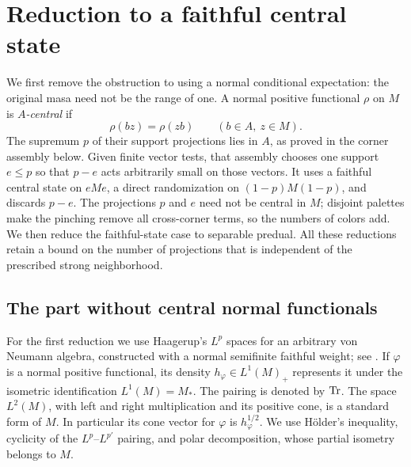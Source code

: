 \section{Reduction to a faithful central state}\label{sec:reductions}

We first remove the obstruction to using a normal conditional expectation:
the original masa need not be the range of one.  A normal positive
functional $\rho$ on $M$ is \emph{$A$-central} if
\[
 \rho(bz)=\rho(zb)\qquad(b\in A,\ z\in M).
\]
The supremum $p$ of their support projections lies in $A$, as proved in
the corner assembly below. Given finite vector tests, that assembly chooses
one support $e\leq p$ so that $p-e$ acts arbitrarily small on those vectors.
It uses a faithful central state on $eMe$, a direct randomization on
$(1-p)M(1-p)$, and discards $p-e$. The projections $p$ and $e$ need not be
central in $M$; disjoint palettes make the pinching remove all cross-corner
terms, so the numbers of colors add. We then reduce the faithful-state case
to separable predual. All these reductions retain a bound on the number of
projections that is independent of the prescribed strong neighborhood.

\subsection{The part without central normal functionals}

For the first reduction we use Haagerup's $L^p$ spaces for an arbitrary
von Neumann algebra, constructed with a normal semifinite faithful
weight; see \cite[Section~1]{Haa79}.  If $\varphi$ is a normal positive
functional, its density $h_\varphi\in L^1(M)_+$ represents it under the
isometric identification $L^1(M)=M_*$.  The pairing is denoted by $\operatorname{Tr}$.
The space $L^2(M)$, with left and right multiplication and its positive
cone, is a standard form of $M$.  In particular its cone vector for
$\varphi$ is $h_\varphi^{1/2}$.  We use H\"older's inequality, cyclicity
of the $L^p$--$L^{p'}$ pairing, and polar decomposition, whose partial
isometry belongs to $M$.

